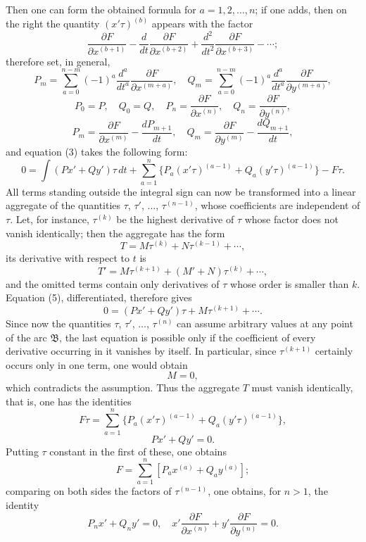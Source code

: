 \documentclass[11pt,a4paper,leqno]{article}
\begin{document}
Then one can form the obtained formula for $a=1,2,\ldots,n$; if one adds, then on the right the quantity $(x'\tau)^{(b)}$ appears with the factor
\[
\frac{\partial F}{\partial x^{(b+1)}}
-\frac{d}{dt}\frac{\partial F}{\partial x^{(b+2)}}
+\frac{d^2}{dt^2}\frac{\partial F}{\partial x^{(b+3)}}-\cdots;
\]
therefore set, in general,
\[
P_m=\sum_{a=0}^{n-m}(-1)^a\frac{d^a}{dt^a}\frac{\partial F}{\partial x^{(m+a)}},
\quad
Q_m=\sum_{a=0}^{n-m}(-1)^a\frac{d^a}{dt^a}\frac{\partial F}{\partial y^{(m+a)}},
\]
\[
P_0=P,\quad Q_0=Q,
\quad P_n=\frac{\partial F}{\partial x^{(n)}},
\quad Q_n=\frac{\partial F}{\partial y^{(n)}},
\]
\begin{equation}\tag{4}
P_m=\frac{\partial F}{\partial x^{(m)}}-\frac{dP_{m+1}}{dt},
\quad
Q_m=\frac{\partial F}{\partial y^{(m)}}-\frac{dQ_{m+1}}{dt},
\end{equation}
and equation (3) takes the following form:
\begin{equation}\tag{5}
0=\int(Px'+Qy')\tau\,dt
+\sum_{a=1}^n\{P_a(x'\tau)^{(a-1)}+Q_a(y'\tau)^{(a-1)}\}-F\tau.
\end{equation}
All terms standing outside the integral sign can now be transformed into a linear aggregate of the quantities $\tau$, $\tau'$, $\ldots$, $\tau^{(n-1)}$, whose coefficients are independent of $\tau$. Let, for instance, $\tau^{(k)}$ be the highest derivative of $\tau$ whose factor does not vanish identically; then the aggregate has the form
\[
T=M\tau^{(k)}+N\tau^{(k-1)}+\cdots,
\]
its derivative with respect to $t$ is
\[
T'=M\tau^{(k+1)}+(M'+N)\tau^{(k)}+\cdots,
\]
and the omitted terms contain only derivatives of $\tau$ whose order is smaller than $k$. Equation (5), differentiated, therefore gives
\[
0=(Px'+Qy')\tau+M\tau^{(k+1)}+\cdots.
\]
Since now the quantities $\tau$, $\tau'$, $\ldots$, $\tau^{(n)}$ can assume arbitrary values at any point of the arc $\mathfrak B$, the last equation is possible only if the coefficient of every derivative occurring in it vanishes by itself. In particular, since $\tau^{(k+1)}$ certainly occurs only in one term, one would obtain
\[
M=0,
\]
which contradicts the assumption. Thus the aggregate $T$ must vanish identically, that is, one has the identities
\[
F\tau=\sum_{a=1}^n\{P_a(x'\tau)^{(a-1)}+Q_a(y'\tau)^{(a-1)}\},
\]
\begin{equation}\tag{6}
Px'+Qy'=0.
\end{equation}
Putting $\tau$ constant in the first of these, one obtains
\begin{equation}\tag{7}
F=\sum_{a=1}^n[P_ax^{(a)}+Q_ay^{(a)}];
\end{equation}
comparing on both sides the factors of $\tau^{(n-1)}$, one obtains, for $n>1$, the identity
\begin{equation}\tag{8}
P_nx'+Q_ny'=0,
\quad
x'\frac{\partial F}{\partial x^{(n)}}+y'\frac{\partial F}{\partial y^{(n)}}=0.
\end{equation}
\end{document}
